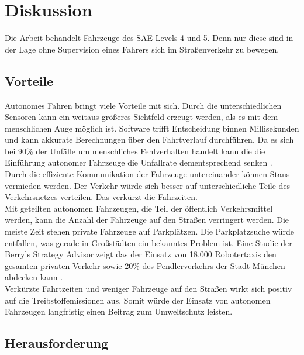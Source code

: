 \section{Diskussion}
\label{sec:diskussion}

Die Arbeit behandelt Fahrzeuge des SAE-Levels 4 und 5. Denn nur diese sind in der Lage ohne Supervision eines Fahrers sich im Straßenverkehr zu bewegen. 

\subsection{Vorteile}

Autonomes Fahren bringt viele Vorteile mit sich. Durch die unterschiedlichen Sensoren kann ein weitaus größeres Sichtfeld erzeugt werden, als es mit dem menschlichen Auge möglich ist. Software trifft Entscheidung binnen Millisekunden und kann akkurate Berechnungen über den Fahrtverlauf durchführen. 
Da es sich bei 90\% der Unfälle um menschliches Fehlverhalten handelt kann die die Einführung autonomer Fahrzeuge die Unfallrate dementsprechend senken \cite{roadSafty}.\\

Durch die effiziente Kommunikation der Fahrzeuge untereinander können Staus vermieden werden. Der Verkehr würde sich besser auf unterschiedliche Teile des Verkehrsnetzes verteilen. Das verkürzt die Fahrzeiten. \\

Mit geteilten autonomen Fahrzeugen, die Teil der öffentlich Verkehrsmittel werden, kann die Anzahl der Fahrzeuge auf den Straßen verringert werden. Die meiste Zeit stehen private Fahrzeuge auf Parkplätzen. Die Parkplatzsuche würde entfallen, was gerade in Großstädten ein bekanntes Problem ist. Eine Studie der Berryls Strategy Advisor zeigt das der Einsatz von 18.000 Robotertaxis den gesamten privaten Verkehr sowie 20\% des Pendlerverkehrs der Stadt München abdecken kann \cite{advisors2017simulation}.\\

Verkürzte Fahrtzeiten und weniger Fahrzeuge auf den Straßen wirkt sich positiv auf die Treibstoffemissionen aus. Somit würde der Einsatz von autonomen Fahrzeugen langfristig einen Beitrag zum Umweltschutz leisten.\\

\subsection{Herausforderung}

